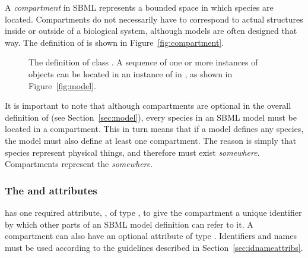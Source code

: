 A \emph{compartment} in SBML represents a bounded space in which
species are located.  Compartments do not necessarily have to
correspond to actual structures inside or outside of a biological
system, although models are often designed that way.  The definition
of \Compartment is shown in Figure~\vref{fig:compartment}.

\begin{figure}[htb]
  \centering
  \small
  \caption{The definition of class \Compartment.  A
      sequence of one or more instances of \Compartment objects
      can be located in an instance of \ListOfCompartments in
      \Model, as shown in Figure~\protect\ref{fig:model}.}
  \label{fig:compartment}
\end{figure}

It is important to note that although compartments are optional in
the overall definition of \Model (see Section~\ref{sec:model}),
every species in an SBML model must be located in a compartment.
This in turn means that if a model defines any species, the model
must also define at least one compartment.  The reason is simply
that species represent physical things, and therefore must exist
\emph{somewhere}.  Compartments represent the \emph{somewhere}.


\subsubsection{The  and  attributes}

\Compartment has one required attribute, , of type
, to give the compartment a unique identifier by
which other parts of an SBML model definition can refer to it.  A
compartment can also have an optional  attribute of type
.  Identifiers and names must be used according
to the guidelines described in Section~\ref{sec:idnameattribs}.


